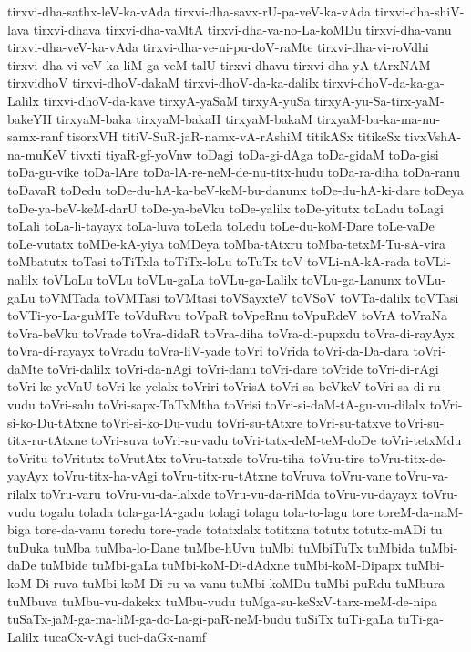 {tirxvi-dha-sathx-leV-ka-vAda
tirxvi-dha-savx-rU-pa-veV-ka-vAda
tirxvi-dha-shiV-lava
tirxvi-dhava
tirxvi-dha-vaMtA
tirxvi-dha-va-no-La-koMDu
tirxvi-dha-vanu
tirxvi-dha-veV-ka-vAda
tirxvi-dha-ve-ni-pu-doV-raMte
tirxvi-dha-vi-roVdhi
tirxvi-dha-vi-veV-ka-liM-ga-veM-talU
tirxvi-dhavu
tirxvi-dha-yA-tArxNAM
tirxvidhoV
tirxvi-dhoV-dakaM
tirxvi-dhoV-da-ka-dalilx
tirxvi-dhoV-da-ka-ga-Lalilx
tirxvi-dhoV-da-kave
tirxyA-yaSaM
tirxyA-yuSa
tirxyA-yu-Sa-tirx-yaM-bakeYH
tirxyaM-baka
tirxyaM-bakaH
tirxyaM-bakaM
tirxyaM-ba-ka-ma-nu-samx-ranf
tisorxVH
titiV-SuR-jaR-namx-vA-rAshiM
titikASx
titikeSx
tivxVshA-na-muKeV
tivxti
tiyaR-gf-yoVnw
toDagi
toDa-gi-dAga
toDa-gidaM
toDa-gisi
toDa-gu-vike
toDa-lAre
toDa-lA-re-neM-de-nu-titx-hudu
toDa-ra-diha
toDa-ranu
toDavaR
toDedu
toDe-du-hA-ka-beV-keM-bu-danunx
toDe-du-hA-ki-dare
toDeya
toDe-ya-beV-keM-darU
toDe-ya-beVku
toDe-yalilx
toDe-yitutx
toLadu
toLagi
toLali
toLa-li-tayayx
toLa-luva
toLeda
toLedu
toLe-du-koM-Dare
toLe-vaDe
toLe-vutatx
toMDe-kA-yiya
toMDeya
toMba-tAtxru
toMba-tetxM-Tu-sA-vira
toMbatutx
toTasi
toTiTxla
toTiTx-loLu
toTuTx
toV
toVLi-nA-kA-rada
toVLi-nalilx
toVLoLu
toVLu
toVLu-gaLa
toVLu-ga-Lalilx
toVLu-ga-Lanunx
toVLu-gaLu
toVMTada
toVMTasi
toVMtasi
toVSayxteV
toVSoV
toVTa-dalilx
toVTasi
toVTi-yo-La-guMTe
toVduRvu
toVpaR
toVpeRnu
toVpuRdeV
toVrA
toVraNa
toVra-beVku
toVrade
toVra-didaR
toVra-diha
toVra-di-pupxdu
toVra-di-rayAyx
toVra-di-rayayx
toVradu
toVra-liV-yade
toVri
toVrida
toVri-da-Da-dara
toVri-daMte
toVri-dalilx
toVri-da-nAgi
toVri-danu
toVri-dare
toVride
toVri-di-rAgi
toVri-ke-yeVnU
toVri-ke-yelalx
toVriri
toVrisA
toVri-sa-beVkeV
toVri-sa-di-ru-vudu
toVri-salu
toVri-sapx-TaTxMtha
toVrisi
toVri-si-daM-tA-gu-vu-dilalx
toVri-si-ko-Du-tAtxne
toVri-si-ko-Du-vudu
toVri-su-tAtxre
toVri-su-tatxve
toVri-su-titx-ru-tAtxne
toVri-suva
toVri-su-vadu
toVri-tatx-deM-teM-doDe
toVri-tetxMdu
toVritu
toVritutx
toVrutAtx
toVru-tatxde
toVru-tiha
toVru-tire
toVru-titx-de-yayAyx
toVru-titx-ha-vAgi
toVru-titx-ru-tAtxne
toVruva
toVru-vane
toVru-va-rilalx
toVru-varu
toVru-vu-da-lalxde
toVru-vu-da-riMda
toVru-vu-dayayx
toVru-vudu
togalu
tolada
tola-ga-lA-gadu
tolagi
tolagu
tola-to-lagu
tore
toreM-da-naM-biga
tore-da-vanu
toredu
tore-yade
totatxlalx
totitxna
totutx
totutx-mADi
tu
tuDuka
tuMba
tuMba-lo-Dane
tuMbe-hUvu
tuMbi
tuMbiTuTx
tuMbida
tuMbi-daDe
tuMbide
tuMbi-gaLa
tuMbi-koM-Di-dAdxne
tuMbi-koM-Dipapx
tuMbi-koM-Di-ruva
tuMbi-koM-Di-ru-va-vanu
tuMbi-koMDu
tuMbi-puRdu
tuMbura
tuMbuva
tuMbu-vu-dakekx
tuMbu-vudu
tuMga-su-keSxV-tarx-meM-de-nipa
tuSaTx-jaM-ga-ma-liM-ga-do-La-gi-paR-neM-budu
tuSiTx
tuTi-gaLa
tuTi-ga-Lalilx
tucaCx-vAgi
tuci-daGx-namf
}

